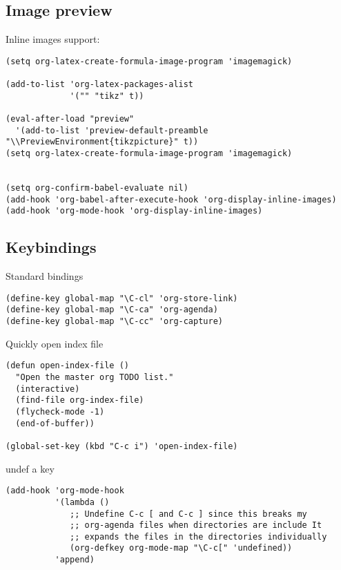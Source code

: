 \documentclass[12pt]{article}
\begin{document}
\subsection{Image preview}
\label{sec-5-8}

Inline images support:

\lstset{language=Lisp,label= ,caption= ,numbers=none}
\begin{lstlisting}
(setq org-latex-create-formula-image-program 'imagemagick)

(add-to-list 'org-latex-packages-alist
             '("" "tikz" t))

(eval-after-load "preview"
  '(add-to-list 'preview-default-preamble "\\PreviewEnvironment{tikzpicture}" t))
(setq org-latex-create-formula-image-program 'imagemagick)


(setq org-confirm-babel-evaluate nil)
(add-hook 'org-babel-after-execute-hook 'org-display-inline-images)   
(add-hook 'org-mode-hook 'org-display-inline-images)
\end{lstlisting}

\subsection{Keybindings}
\label{sec-5-9}


Standard bindings

\lstset{language=Lisp,label= ,caption= ,numbers=none}
\begin{lstlisting}
(define-key global-map "\C-cl" 'org-store-link)
(define-key global-map "\C-ca" 'org-agenda)
(define-key global-map "\C-cc" 'org-capture)
\end{lstlisting}

Quickly open index file
\lstset{language=Lisp,label= ,caption= ,numbers=none}
\begin{lstlisting}
(defun open-index-file ()
  "Open the master org TODO list."
  (interactive)
  (find-file org-index-file)
  (flycheck-mode -1)
  (end-of-buffer))

(global-set-key (kbd "C-c i") 'open-index-file)
\end{lstlisting}


undef a key

\lstset{language=Lisp,label= ,caption= ,numbers=none}
\begin{lstlisting}
(add-hook 'org-mode-hook
          '(lambda ()
             ;; Undefine C-c [ and C-c ] since this breaks my
             ;; org-agenda files when directories are include It
             ;; expands the files in the directories individually
             (org-defkey org-mode-map "\C-c[" 'undefined))
          'append)
\end{lstlisting}
\end{document}
